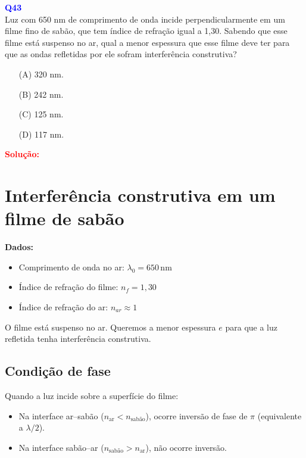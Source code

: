 \documentclass[a4paper,12pt]{article}
\begin{document}
\begin{flushleft}
\textbf{\textcolor{blue}{\Large Q43}}\\
\noindent
Luz com 650 nm de comprimento de onda incide
perpendicularmente em um filme fino de sabão, que tem
índice de refração igual a 1,30. Sabendo que esse filme está
suspenso no ar, qual a menor espessura que esse filme
deve ter para que as ondas refletidas por ele sofram
interferência construtiva?

\begin{itemize}
\item[(A)] 320 nm.
\item[(B)] 242 nm.
\item[(C)] 125 nm.
\item[(D)] 117 nm.
\end{itemize}

\vspace{0.5cm}

\textcolor{red}{\textbf{Solução:}}\\

\section*{Interferência construtiva em um filme de sabão}

\textbf{Dados:}
\begin{itemize}
    \item Comprimento de onda no ar: \( \lambda_0 = 650\,\mathrm{nm} \)
    \item Índice de refração do filme: \( n_f = 1{,}30 \)
    \item Índice de refração do ar: \( n_{ar} \approx 1 \)
\end{itemize}

O filme está suspenso no ar. Queremos a menor espessura \(e\) para que a luz refletida tenha interferência construtiva.

\subsection*{Condição de fase}

Quando a luz incide sobre a superfície do filme:
\begin{itemize}
    \item Na interface ar–sabão (\(n_\text{ar} < n_\text{sabão}\)), ocorre inversão de fase de \(\pi\) (equivalente a \(\lambda/2\)).
    \item Na interface sabão–ar (\(n_\text{sabão} > n_\text{ar}\)), não ocorre inversão.
\end{itemize}


\end{flushleft}
\end{document}
